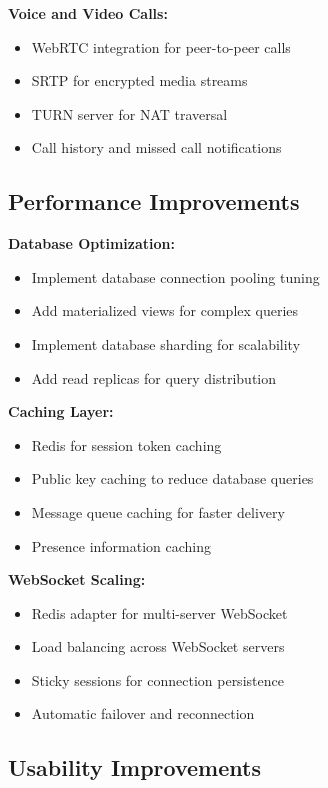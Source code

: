 \textbf{Voice and Video Calls:}
\begin{itemize}
    \item WebRTC integration for peer-to-peer calls
    \item SRTP for encrypted media streams
    \item TURN server for NAT traversal
    \item Call history and missed call notifications
\end{itemize}

\subsection{Performance Improvements}

\textbf{Database Optimization:}
\begin{itemize}
    \item Implement database connection pooling tuning
    \item Add materialized views for complex queries
    \item Implement database sharding for scalability
    \item Add read replicas for query distribution
\end{itemize}

\textbf{Caching Layer:}
\begin{itemize}
    \item Redis for session token caching
    \item Public key caching to reduce database queries
    \item Message queue caching for faster delivery
    \item Presence information caching
\end{itemize}

\textbf{WebSocket Scaling:}
\begin{itemize}
    \item Redis adapter for multi-server WebSocket
    \item Load balancing across WebSocket servers
    \item Sticky sessions for connection persistence
    \item Automatic failover and reconnection
\end{itemize}

\subsection{Usability Improvements}

